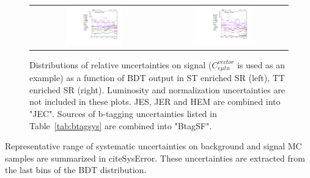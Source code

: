 \begin{figure}[tbh!]
 \begin{center}
 \begin{tabular}{cc}
    \includegraphics[width=0.45\textwidth]{figures/Part3/Systematics/sysBDT_ST_sig_2017}&
  \includegraphics[width=0.45\textwidth]{figures/Part3/Systematics/sysBDT_TT_sig_2017} \\
 \end{tabular}
 \caption{Distributions of relative uncertainties on signal ($C_{e\mu tu}^{vector}$ is used as an example) as a function of BDT output in ST enriched SR (left), TT enriched SR (right). Luminosity and normalization uncertainties are not included in these plots. JES, JER and HEM are combined into "JEC". Sources of b-tagging uncertainties listed in Table~\ref{tab:btagsys} are combined into "BtagSF".}
 \label{fig:Comp_sys_signal}
 \end{center}
\end{figure}

Representative range of systematic uncertainties on background and signal MC samples are summarized in cite{SysError}. These uncertainties are extracted from the last bins of the BDT distribution.